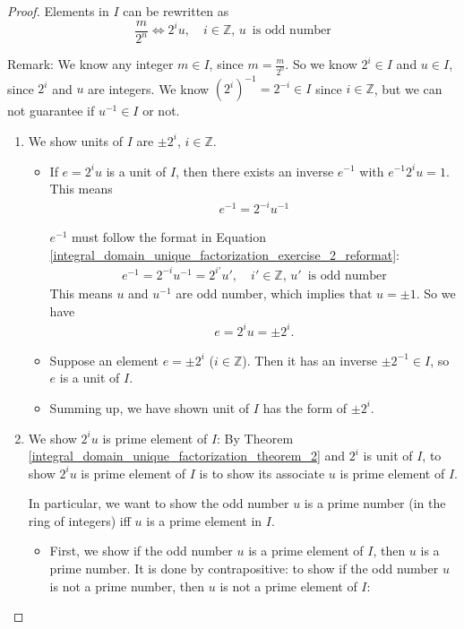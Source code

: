 \documentclass[utf8]{ctexbook}
\begin{document}
\begin{proof}
Elements in $I$ can be rewritten as
\begin{equation}\label{integral_domain_unique_factorization_exercise_2_reformat}
\frac{m}{2^n} \Longleftrightarrow 2^i u , \quad i \in \mathbb{Z}, \, u \, \mbox{ is odd number}
\end{equation}

Remark: We know any integer $m \in I$, since $m = \frac{m}{2^0}$. So we know $2^i \in I$ and $u \in I$, since $2^i$ and $u$ are integers. We know $(2^{i})^{-1} = 2^{-i} \in I$ since $i \in \mathbb{Z}$, but we can not guarantee if $u^{-1} \in I$ or not.   

\begin{enumerate}
\item{We show units of $I$ are $\pm 2^i$, $i \in \mathbb{Z}$.}
\begin{itemize}
\item{If $e = 2^i u$ is a unit of $I$, then there exists an inverse $e^{-1}$ with $e^{-1} 2^i u = 1 $. This means 
\begin{align*}
e^{-1} = 2^{-i} u^{-1}
\end{align*}

$e^{-1}$ must follow the format in Equation \ref{integral_domain_unique_factorization_exercise_2_reformat}:
\begin{align*}
e^{-1} = 2^{-i} u^{-1} = 2^{i'} u', \quad i' \in \mathbb{Z}, \, u' \, \mbox{ is odd number}
\end{align*}
This means $u$ and $u^{-1}$ are odd number, which implies that $u = \pm 1$. So we have
\begin{align*}
e = 2^i u = \pm 2^i .
\end{align*}
}
\item{Suppose an element $e = \pm 2^i$ ($i \in \mathbb{Z}$). Then it has an inverse $\pm 2^{-1} \in I$, so $e$ is a unit of $I$.
}
\item{Summing up, we have shown unit of $I$ has the form of $\pm 2^{i}$.}
\end{itemize}
\item{We show $2^i u $ is prime element of $I$: By Theorem \ref{integral_domain_unique_factorization_theorem_2} and $2^i$ is unit of $I$, to show $2^i u $ is prime element of $I$ is to show its associate $u$ is prime element of $I$.

In particular, we want to show the odd number $u$ is a prime number (in the ring of integers) iff $u$ is a prime element in $I$.}
\begin{itemize}
\item{First, we show if the odd number $u$ is a prime element of $I$, then $u$ is a prime number. It is done by contrapositive: to show if the odd number $u$ is not a prime number, then $u$ is not a prime element of $I$:

}
\end{itemize}
\end{enumerate}
\end{proof}
\end{document}

